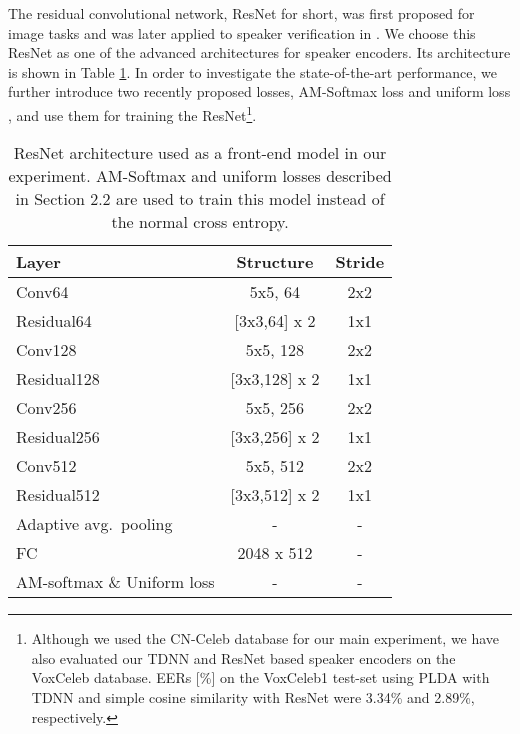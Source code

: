 \documentclass[a4paper]{article}
\begin{document}
The residual convolutional network, ResNet for short, was first proposed for image tasks \cite{He2016-ResNet} and was later applied to speaker verification in \cite{Li2017-DS}. We choose this ResNet as one of the advanced architectures for speaker encoders. Its architecture is shown in Table \ref{tab:resnet}. In order to investigate the state-of-the-art performance, we further introduce two recently proposed losses, AM-Softmax loss \cite{Wang2018-AM,Wang2018-LMCL} and uniform loss \cite{Duan2019-Uniform}, and use them for training the ResNet\footnote{Although we used the CN-Celeb database for our main experiment, we have also evaluated our TDNN and ResNet based speaker encoders on the VoxCeleb database. EERs [\%] on the VoxCeleb1 test-set using PLDA with TDNN and simple cosine similarity with ResNet were 3.34\% and 2.89\%, respectively.}. 

\setlength{\tabcolsep}{4mm}
\begin{table}[t]
\footnotesize
  \caption{ResNet architecture used as a front-end model in our experiment. AM-Softmax and uniform losses described in Section 2.2 are used to train this model instead of the normal cross entropy.}
  \label{tab:resnet}
  \centering
  \vspace{-2mm}
  \begin{tabular}{l c c}
    \toprule
    \multicolumn{1}{l}{\textbf{Layer}} & \multicolumn{1}{c}{\textbf{Structure}} & \multicolumn{1}{c}{\textbf{Stride}}\\
    \midrule
    Conv64                    & 5x5, 64       & 2x2             \\
    Residual64                     & [3x3,64] x 2  & 1x1              \\
Conv128                   & 5x5, 128      & 2x2              \\
    Residual128                    & [3x3,128] x 2 & 1x1              \\
Conv256                   & 5x5, 256      & 2x2            \\
    Residual256                    & [3x3,256] x 2 & 1x1             \\
Conv512                   & 5x5, 512      & 2x2              \\
    Residual512                    & [3x3,512] x 2 & 1x1             \\
Adaptive avg.\ pooling          & -         & -             \\
    FC                        & 2048 x 512    & -                \\
    AM-softmax \& Uniform loss          & -        & -                    \\
    \bottomrule
  \end{tabular}
  \vspace{-5mm}
\end{table}
\end{document}
